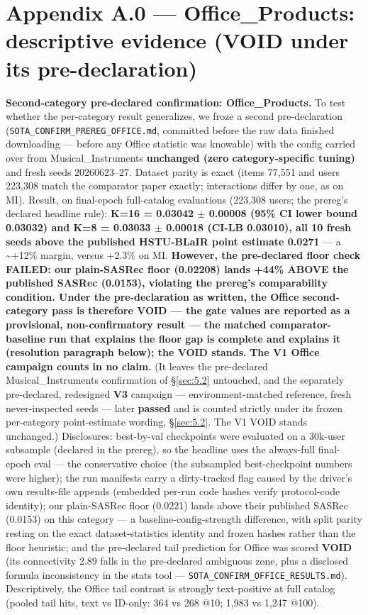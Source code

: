 \section*{Appendix A.0 --- Office\_Products: descriptive evidence (VOID under its pre-declaration)}

\textbf{Second-category pre-declared confirmation: Office\_Products.} To test whether the per-category result generalizes, we froze a second pre-declaration (\texttt{SOTA\_CONFIRM\_PREREG\_OFFICE.md}, committed before the raw data finished downloading --- before any Office statistic was knowable) with the config carried over from Musical\_Instruments \textbf{unchanged (zero category-specific tuning)} and fresh seeds 20260623--27. Dataset parity is exact (items 77,551 and users 223,308 match the comparator paper exactly; interactions differ by one, as on MI). Result, on final-epoch full-catalog evaluations (223,308 users; the prereg's declared headline rule): \textbf{K=16 = 0.03042 \ensuremath{\pm} 0.00008 (95\% CI lower bound 0.03032) and K=8 = 0.03033 \ensuremath{\pm} 0.00018 (CI-LB 0.03010), all 10 fresh seeds above the published HSTU-BLaIR point estimate 0.0271} --- a \textasciitilde{}+12\% margin, versus +2.3\% on MI. \textbf{However, the pre-declared floor check FAILED: our plain-SASRec floor (0.02208) lands +44\% ABOVE the published SASRec (0.0153), violating the prereg's comparability condition. Under the pre-declaration as written, the Office second-category pass is therefore VOID --- the gate values are reported as a provisional, non-confirmatory result --- the matched comparator-baseline run that explains the floor gap is complete and explains it (resolution paragraph below); the VOID stands.} \textbf{The V1 Office campaign counts in no claim.} (It leaves the pre-declared Musical\_Instruments confirmation of \S\ref{sec:5.2} untouched, and the separately pre-declared, redesigned \textbf{V3} campaign --- environment-matched reference, fresh never-inspected seeds --- later \textbf{passed} and is counted strictly under its frozen per-category point-estimate wording, \S\ref{sec:5.2}. The V1 VOID stands unchanged.) Disclosures: best-by-val checkpoints were evaluated on a 30k-user subsample (declared in the prereg), so the headline uses the always-full final-epoch eval --- the conservative choice (the subsampled best-checkpoint numbers were higher); the run manifests carry a dirty-tracked flag caused by the driver's own results-file appends (embedded per-run code hashes verify protocol-code identity); our plain-SASRec floor (0.0221) lands above their published SASRec (0.0153) on this category --- a baseline-config-strength difference, with split parity resting on the exact dataset-statistics identity and frozen hashes rather than the floor heuristic; and the pre-declared tail prediction for Office was scored \textbf{VOID} (its connectivity 2.89 falls in the pre-declared ambiguous zone, plus a disclosed formula inconsistency in the stats tool --- \texttt{SOTA\_CONFIRM\_OFFICE\_RESULTS.md}). Descriptively, the Office tail contrast is strongly text-positive at full catalog (pooled tail hits, text vs ID-only: 364 vs 268 @10; 1,983 vs 1,247 @100). 